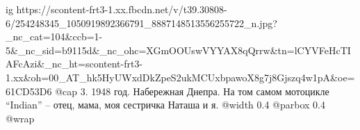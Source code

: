  
 
 
 
 

\ifcmt
  ig https://scontent-frt3-1.xx.fbcdn.net/v/t39.30808-6/254248345_1050919892366791_8887148513556255722_n.jpg?_nc_cat=104&ccb=1-5&_nc_sid=b9115d&_nc_ohc=XGmOOUswVYYAX8qQrrw&tn=lCYVFeHcTIAFcAzi&_nc_ht=scontent-frt3-1.xx&oh=00_AT_hk5HyUWxdDkZpeS2ukMCUxbpawoX8g7j8Gjszq4w1pA&oe=61CD53D6
  @cap 3. 1948 год. Набережная Днепра. На том самом мотоцикле \enquote{Indian} – отец, мама, моя сестричка Наташа и я. 
  @width 0.4
  @parbox 0.4
  @wrap \parpic[r]
\fi

